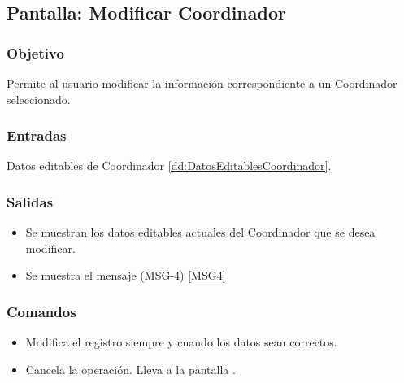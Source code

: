 \subsection{Pantalla: Modificar Coordinador}

\subsubsection{Objetivo}
Permite al usuario modificar la información correspondiente a un Coordinador seleccionado.


\subsubsection{Entradas}
Datos editables de Coordinador \ref{dd:DatosEditablesCoordinador}.

\subsubsection{Salidas}
\begin{itemize}
 \item Se muestran los datos editables actuales del Coordinador que se desea modificar.
 \item Se muestra el mensaje (MSG-4) \ref{MSG4} 
\end{itemize}

\subsubsection{Comandos}
\begin{itemize}
 \item {} Modifica el registro siempre y cuando los datos sean correctos.
 \item {} Cancela la operación. Lleva a la pantalla .

\end{itemize}
